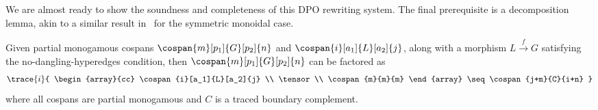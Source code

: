 \noindent
We are almost ready to show the soundness and completeness of this DPO rewriting
system.
The final prerequisite is a decomposition lemma, akin to a similar result
in~\cite{bonchi2021string} for the symmetric monoidal case.

\begin{lemma}\label{lem:decomposition}
    Given partial monogamous cospans \(\cospan{m}[p_1]{G}[p_2]{n}\) and \(
        \cospan{i}[a_1]{L}[a_2]{j}
    \), along with a morphism \(
        L \xrightarrow{f} G
    \) satisfying the no-dangling-hyperedges condition, then \(
        \cospan{m}[p_1]{G}[p_2]{n}
    \) can be factored as
    \begin{gather}
        \trace{i}{
            \begin{array}{cc}
                \cospan{i}[a_1]{L}[a_2]{j} \\
                \tensor \\
                \cospan{m}{m}{m}
            \end{array}
            \seq
            \cospan{j+m}{C}{i+n}
        }
        \label{gath:decomposition}
    \end{gather}
    where all cospans are partial monogamous and \(C\) is a traced boundary
    complement.
\end{lemma}
